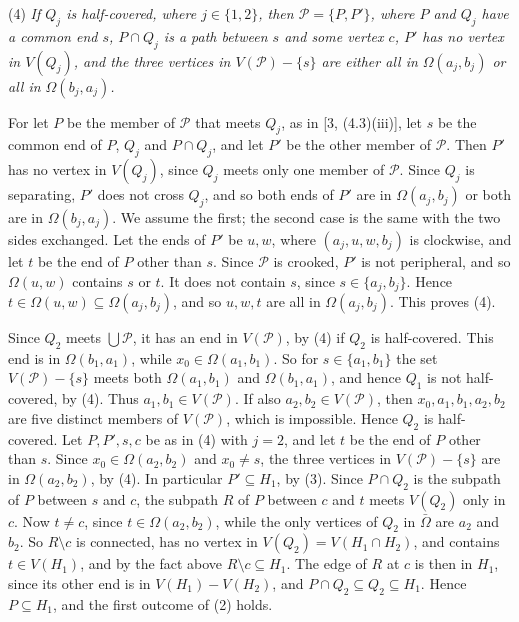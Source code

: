 {\hspace*{12pt}(4) \textit{If $Q_j$ is half-covered, where $j \in \{1, 2\}$, then $\mathscr{P} = \{P, P'\}$, where $P$ and $Q_j$ have a common end $s$, $P \cap Q_j$ is a path between $s$ and some vertex $c$, $P'$ has no vertex in $V(Q_j)$, and the three vertices in $V(\mathscr{P}) - \{s\}$ are either all in $\Omega(a_j, b_j)$ or all in $\Omega(b_j, a_j)$.}

For let $P$ be the member of $\mathscr{P}$ that meets $Q_j$, as in [3, (4.3)(iii)], let $s$ be the common end of $P$, $Q_j$ and $P \cap Q_j$, and let $P'$ be the other member of $\mathscr{P}$. Then $P'$ has no vertex in $V(Q_j)$, since $Q_j$ meets only one member of $\mathscr{P}$. Since $Q_j$ is separating, $P'$ does not cross $Q_j$, and so both ends of $P'$ are in $\Omega(a_j, b_j)$ or both are in $\Omega(b_j, a_j)$. We assume the first; the second case is the same with the two sides exchanged. Let the ends of $P'$ be $u, w$, where $(a_j, u, w, b_j)$ is clockwise, and let $t$ be the end of $P$ other than $s$. Since $\mathscr{P}$ is crooked, $P'$ is not peripheral, and so $\Omega(u, w)$ contains $s$ or $t$. It does not contain $s$, since $s \in \{a_j, b_j\}$. Hence $t \in \Omega(u, w) \subseteq \Omega(a_j, b_j)$, and so $u, w, t$ are all in $\Omega(a_j, b_j)$. This proves (4).

Since $Q_2$ meets $\bigcup \mathscr{P}$, it has an end in $V(\mathscr{P})$, by (4) if $Q_2$ is half-covered. This end is in $\Omega(b_1, a_1)$, while $x_0 \in \Omega(a_1, b_1)$. So for $s \in \{a_1, b_1\}$ the set $V(\mathscr{P}) - \{s\}$ meets both $\Omega(a_1, b_1)$ and $\Omega(b_1, a_1)$, and hence $Q_1$ is not half-covered, by (4). Thus $a_1, b_1 \in V(\mathscr{P})$. If also $a_2, b_2 \in V(\mathscr{P})$, then $x_0, a_1, b_1, a_2, b_2$ are five distinct members of $V(\mathscr{P})$, which is impossible. Hence $Q_2$ is half-covered. Let $P, P', s, c$ be as in (4) with $j = 2$, and let $t$ be the end of $P$ other than $s$. Since $x_0 \in \Omega(a_2, b_2)$ and $x_0 \ne s$, the three vertices in $V(\mathscr{P}) - \{s\}$ are in $\Omega(a_2, b_2)$, by (4). In particular $P' \subseteq H_1$, by (3). Since $P \cap Q_2$ is the subpath of $P$ between $s$ and $c$, the subpath $R$ of $P$ between $c$ and $t$ meets $V(Q_2)$ only in $c$. Now $t \ne c$, since $t \in \Omega(a_2, b_2)$, while the only vertices of $Q_2$ in $\bar{\Omega}$ are $a_2$ and $b_2$. So $R \setminus c$ is connected, has no vertex in $V(Q_2) = V(H_1 \cap H_2)$, and contains $t \in V(H_1)$, and by the fact above $R \setminus c \subseteq H_1$. The edge of $R$ at $c$ is then in $H_1$, since its other end is in $V(H_1) - V(H_2)$, and $P \cap Q_2 \subseteq Q_2 \subseteq H_1$. Hence $P \subseteq H_1$, and the first outcome of (2) holds.

}
